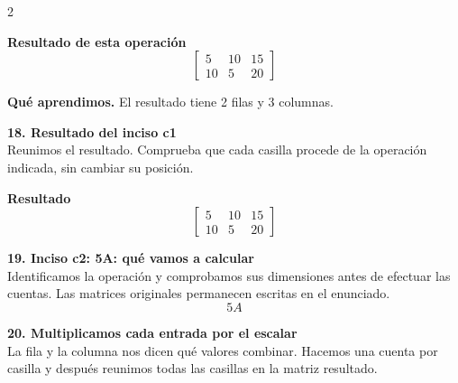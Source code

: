 \documentclass[11pt,a4paper,landscape]{article}
\begin{document}
\begin{multicols*}{2}
\begin{minipage}{\linewidth}
\par\smallskip \textbf{Resultado de esta operación}\[\begin{bmatrix}5 & 10 & 15\\10 & 5 & 20\end{bmatrix}\]
\par\smallskip\textbf{Qué aprendimos.} El resultado tiene 2 filas y 3 columnas.
\end{minipage}\par\medskip
\noindent\begin{minipage}{\linewidth}\textbf{18. Resultado del inciso c1}\\[2pt]Reunimos el resultado. Comprueba que cada casilla procede de la operación indicada, sin cambiar su posición.
\par\smallskip \textbf{Resultado}\[\begin{bmatrix}5 & 10 & 15\\10 & 5 & 20\end{bmatrix}\]
\end{minipage}\par\medskip
\noindent\begin{minipage}{\linewidth}\textbf{19. Inciso c2: 5A: qué vamos a calcular}\\[2pt]Identificamos la operación y comprobamos sus dimensiones antes de efectuar las cuentas. Las matrices originales permanecen escritas en el enunciado.
\[5A\]
\end{minipage}\par\medskip
\noindent\begin{minipage}{\linewidth}\textbf{20. Multiplicamos cada entrada por el escalar}\\[2pt]La fila y la columna nos dicen qué valores combinar. Hacemos una cuenta por casilla y después reunimos todas las casillas en la matriz resultado.
\par{}\par\smallskip

\end{minipage}
\end{multicols*}
\end{document}
